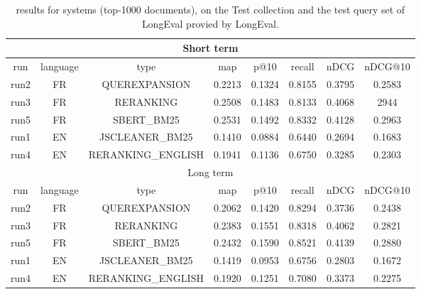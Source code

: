 \begin{table}[h!]
    \centering
    \begin{tabular}{ |c|c|c|c|c|c|c|c| }
        \hline
        \hline
        \multicolumn{8}{|c|}{Short term} \\ \hline
        run  & language & type & map & p@10 & recall & nDCG & nDCG@10 \\ \hline
        run2 &   FR   & QUEREXPANSION & 0.2213 & 0.1324 & 0.8155 & 0.3795 & 0.2583 \\
        run3 &   FR   & RERANKING & 0.2508 & 0.1483 & 0.8133 & 0.4068 & 2944 \\
        run5 &   FR   & SBERT\_BM25 & 0.2531 & 0.1492 & 0.8332 & 0.4128 & 0.2963 \\
        \hline
        run1 &   EN   & JSCLEANER\_BM25 & 0.1410 & 0.0884 & 0.6440 & 0.2694 & 0.1683 \\
        run4 &   EN   & RERANKING\_ENGLISH & 0.1941 & 0.1136 & 0.6750 & 0.3285 & 0.2303 \\
        \hline
        \hline
        \multicolumn{8}{|c|}{Long term} \\ \hline
        run  & language & type & map & p@10 & recall & nDCG & nDCG@10 \\ \hline
        run2 &   FR   & QUEREXPANSION & 0.2062 & 0.1420 & 0.8294 & 0.3736 & 0.2438 \\
        run3 &   FR   & RERANKING & 0.2383 & 0.1551 & 0.8318 & 0.4062 & 0.2821 \\
        run5 &   FR   & SBERT\_BM25 & 0.2432 & 0.1590 & 0.8521 & 0.4139 & 0.2880 \\
        \hline
        run1 &   EN   & JSCLEANER\_BM25 & 0.1419 & 0.0953 & 0.6756 & 0.2803 & 0.1672 \\
        run4 &   EN   & RERANKING\_ENGLISH & 0.1920 & 0.1251 & 0.7080 & 0.3373 & 0.2275 \\
        \hline
    \end{tabular}
    \caption{results for systems (top-1000 documents), on the Test collection and the test query set of LongEval provied by LongEval.}
    \label{tab:results_submission_test}
\end{table}

